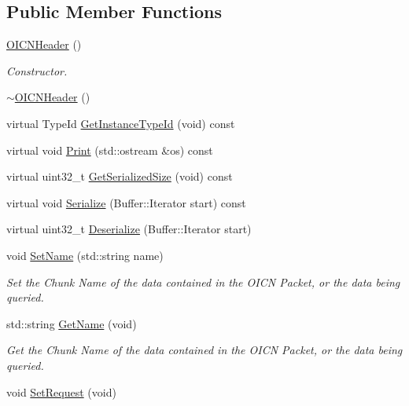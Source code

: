 \subsection*{Public Member Functions}
\begin{DoxyCompactItemize}
\item 
\hyperlink{classns3_1_1OICNHeader_a4cbc33855f4a10ff783c381913ee96f0}{O\-I\-C\-N\-Header} ()
\begin{DoxyCompactList}\small\item\em Constructor. \end{DoxyCompactList}\item 
\hyperlink{classns3_1_1OICNHeader_a669c56c7d6c3fc928b1977e21ce01cba}{$\sim$\-O\-I\-C\-N\-Header} ()
\item 
virtual Type\-Id \hyperlink{classns3_1_1OICNHeader_afcb518fa0b425c74331e45273acafa12}{Get\-Instance\-Type\-Id} (void) const 
\item 
virtual void \hyperlink{classns3_1_1OICNHeader_a980575816ee9aea6247edbdc0434b80e}{Print} (std\-::ostream \&os) const 
\item 
virtual uint32\-\_\-t \hyperlink{classns3_1_1OICNHeader_a07608434af126c8a9c215653594b826d}{Get\-Serialized\-Size} (void) const 
\item 
virtual void \hyperlink{classns3_1_1OICNHeader_ab37b3c5b45fc5240cd156f90f05918de}{Serialize} (Buffer\-::\-Iterator start) const 
\item 
virtual uint32\-\_\-t \hyperlink{classns3_1_1OICNHeader_a059726f2757bfa5ce6bcf6d8015fb6e4}{Deserialize} (Buffer\-::\-Iterator start)
\item 
void \hyperlink{classns3_1_1OICNHeader_a6a5e2e963b9d7e5e1544f52c4ec7bf29}{Set\-Name} (std\-::string name)
\begin{DoxyCompactList}\small\item\em Set the Chunk Name of the data contained in the O\-I\-C\-N Packet, or the data being queried. \end{DoxyCompactList}\item 
std\-::string \hyperlink{classns3_1_1OICNHeader_a1d062df515f4e4b8286e5437db6d3480}{Get\-Name} (void)
\begin{DoxyCompactList}\small\item\em Get the Chunk Name of the data contained in the O\-I\-C\-N Packet, or the data being queried. \end{DoxyCompactList}\item 
void \hyperlink{classns3_1_1OICNHeader_a8227da3b57b8c276bd3168cdd52a7d50}{Set\-Request} (void)

\end{DoxyCompactItemize}
